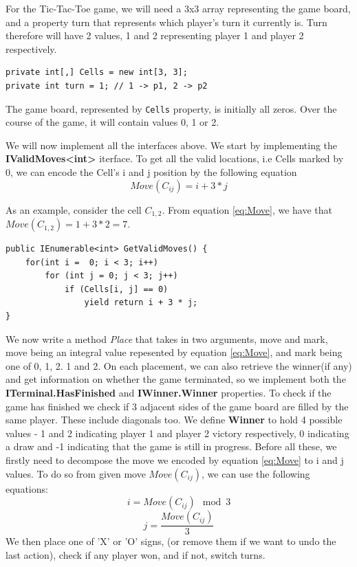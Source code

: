 For the Tic-Tac-Toe game, we will need a 3x3 array representing the game board, and a property turn that represents which player's turn it currently is. Turn therefore will have 2 values, 1 and 2 representing player 1 and player 2 respectively.

\begin{lstlisting}
private int[,] Cells = new int[3, 3];
private int turn = 1; // 1 -> p1, 2 -> p2
\end{lstlisting}

The game board, represented by \texttt{Cells} property, is initially all zeros. Over the course of the game, it will contain values 0, 1 or 2.

We will now implement all the interfaces above. We start by implementing the \textbf{IValidMoves\textless{}int\textgreater{}} iterface. To get all the valid locations, i.e Cells marked by 0, we can encode the Cell's i and j position by the following equation
\begin{equation}
\label{eq:Move}
    Move(C_{ij}) = i + 3 * j
\end{equation}

As an example, consider the cell $C_{1,2}$. From equation \ref{eq:Move}, we have that $Move(C_{1,2}) = 1 + 3 * 2 = 7$.

\begin{lstlisting}
public IEnumerable<int> GetValidMoves() {
    for(int i =  0; i < 3; i++)
        for (int j = 0; j < 3; j++)
            if (Cells[i, j] == 0)
                yield return i + 3 * j;
}
\end{lstlisting}

We now write a method \textit{Place} that takes in two arguments, move and mark, move being an integral value repesented by equation \ref{eq:Move}, and mark being one of 0, 1, 2. 1 and 2.
On each placement, we can also retrieve the winner(if any) and get information on whether the game terminated, so we implement both the \textbf{ITerminal.HasFinished} and \textbf{IWinner.Winner} properties. To check if the game has finished we check if 3 adjacent sides of the game board are filled by the same player. These include diagonals too.
We define \textbf{Winner} to hold 4 possible values - 1 and 2 indicating player 1 and player 2 victory respectively, 0 indicating a draw and -1 indicating that the game is still in progress.
Before all these, we firstly need to decompose the move we encoded by equation \ref{eq:Move} to i and j values. To do so from given move $Move(C_{ij})$, we can use the following equations:
\begin{equation}
    i = Move(C_{ij}) \mod 3
\end{equation}
\begin{equation}
    j = \frac{Move(C_{ij})}{3}
\end{equation}
We then place one of 'X' or 'O' signs, (or remove them if we want to undo the last action), check if any player won, and if not, switch turns.

